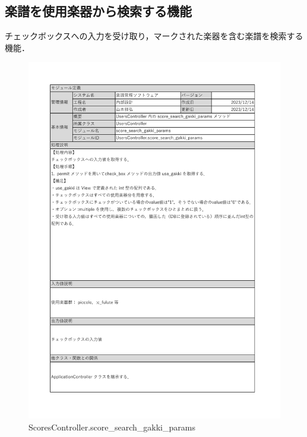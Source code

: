 \subsection*{楽譜を使用楽器から検索する機能}
チェックボックスへの入力を受け取り，マークされた楽器を含む楽譜を検索する機能．
\begin{figure}[H]
    \centering
    \includegraphics[scale=0.5]{img/Method/score_search_gakki_params.pdf}
    \caption{ScoresController.score\_search\_gakki\_params}
\end{figure}
